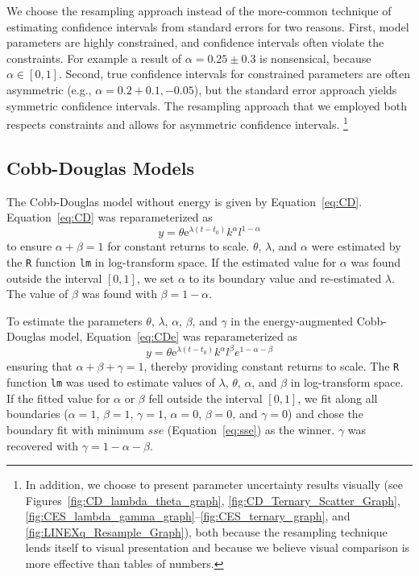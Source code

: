 \documentclass[preprint,authoryear,12pt]{elsarticle}\usepackage[]{graphicx}\usepackage[]{color}
\begin{document}
We choose the resampling approach instead of the more-common technique 
of estimating confidence intervals from standard errors for two reasons. 
First, model parameters are highly constrained, and confidence intervals often violate the constraints. 
For example a result of $\alpha = 0.25 \pm 0.3$ is nonsensical, 
because $ \alpha \in [0, 1]$. 
Second, true confidence intervals for constrained parameters are often asymmetric
(e.g., $\alpha = 0.2 + 0.1, -0.05$), 
but the standard error approach yields symmetric confidence intervals. 
The resampling approach that we employed both respects constraints 
and allows for asymmetric confidence intervals.%
  \footnote{
  In addition, we choose to present parameter uncertainty results visually 
  (see Figures~\ref{fig:CD_lambda_theta_graph}, \ref{fig:CD_Ternary_Scatter_Graph},
  \ref{fig:CES_lambda_gamma_graph}--\ref{fig:CES_ternary_graph}, and
  \ref{fig:LINEXq_Resample_Graph}),
  both because the resampling technique lends itself to visual presentation and 
  because we believe visual comparison is more effective than tables of numbers.
  }


\subsection{Cobb-Douglas Models}
\label{sec:CD_Parameter_Estimation}

The Cobb-Douglas model without energy is given by 
Equation~\ref{eq:CD}. Equation~\ref{eq:CD} was
reparameterized as
%
\begin{equation} \label{eq:CD_reparam}
  y = \theta \mathrm{e}^{\lambda (t-t_0)} k^{\alpha} l^{1-\alpha}
\end{equation}
%
\noindent to ensure $\alpha + \beta = 1$ for constant returns to scale. 
$\theta$, $\lambda$, and $\alpha$ were estimated by the 
\texttt{R} \citep{R} function \texttt{lm} in log-transform space. 
If the estimated value for $\alpha$ was found outside the interval $[0,1]$, 
we set $\alpha$ to its boundary value and re-estimated $\lambda$. 
The value of $\beta$ was found with $\beta = 1 - \alpha$. 

To estimate the parameters $\theta$, $\lambda$, $\alpha$, $\beta$, and $\gamma$ 
in the energy-augmented Cobb-Douglas model, Equation~\ref{eq:CDe} 
was reparameterized as
%
\begin{equation} \label{eq:CDe_AB_reparam}
  y = \theta \mathrm{e}^{\lambda (t-t_0)} k^{\alpha} l^{\beta} e^{1 - \alpha - \beta}
\end{equation}
%
ensuring that $\alpha + \beta + \gamma = 1$,
thereby providing constant returns to scale.
The \texttt{R} \citep{R} function \texttt{lm} was used to estimate 
values of $\lambda$, $\theta$, $\alpha$, and $\beta$ in log-transform space.
If the fitted value for $\alpha$ or $\beta$ fell outside the interval $[0,1]$,
we fit along all boundaries 
($\alpha = 1$,
$\beta = 1$,
$\gamma = 1$,
$\alpha = 0$,
$\beta = 0$, and
$\gamma = 0$)
and chose the boundary fit with
minimum $sse$ (Equation~\ref{eq:sse}) as the winner.
$\gamma$ was recovered with $\gamma = 1 - \alpha - \beta$.
\end{document}
